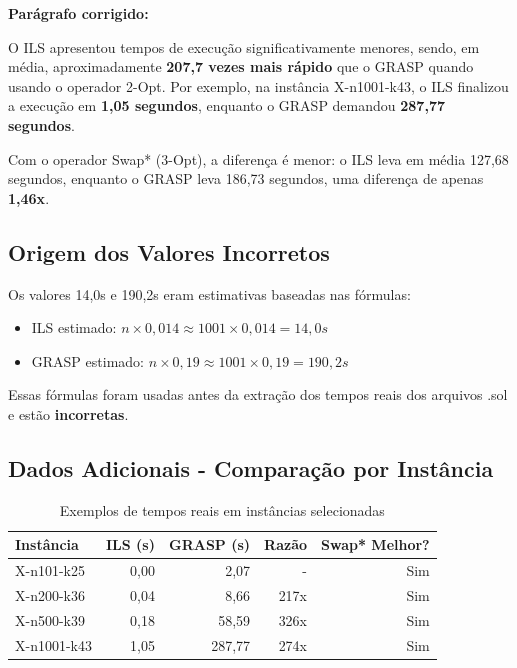 \documentclass[12pt,a4paper]{article}
\begin{document}
\textbf{Parágrafo corrigido:}

O ILS apresentou tempos de execução significativamente menores, sendo, em média, aproximadamente \textbf{207,7 vezes mais rápido} que o GRASP quando usando o operador 2-Opt. Por exemplo, na instância X-n1001-k43, o ILS finalizou a execução em \textbf{1,05 segundos}, enquanto o GRASP demandou \textbf{287,77 segundos}.

Com o operador Swap* (3-Opt), a diferença é menor: o ILS leva em média 127,68 segundos, enquanto o GRASP leva 186,73 segundos, uma diferença de apenas \textbf{1,46x}.

\subsection*{Origem dos Valores Incorretos}

Os valores 14,0s e 190,2s eram estimativas baseadas nas fórmulas:
\begin{itemize}
    \item ILS estimado: $n \times 0,014 \approx 1001 \times 0,014 = 14,0s$
    \item GRASP estimado: $n \times 0,19 \approx 1001 \times 0,19 = 190,2s$
\end{itemize}

Essas fórmulas foram usadas antes da extração dos tempos reais dos arquivos .sol e estão \textbf{incorretas}.

\subsection*{Dados Adicionais - Comparação por Instância}

\begin{table}[h]
\centering
\small
\begin{tabular}{lrrrr}
\toprule
Instância & ILS (s) & GRASP (s) & Razão & Swap* Melhor? \\
\midrule
X-n101-k25   & 0,00  & 2,07    & -    & Sim \\
X-n200-k36   & 0,04  & 8,66    & 217x & Sim \\
X-n500-k39   & 0,18  & 58,59   & 326x & Sim \\
X-n1001-k43  & 1,05  & 287,77  & 274x & Sim \\
\bottomrule
\end{tabular}
\caption{Exemplos de tempos reais em instâncias selecionadas}
\end{table}
\end{document}
